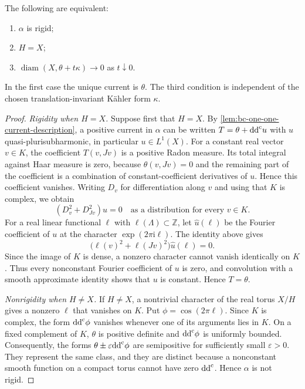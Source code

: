 \begin{theorem}\label{thm:flat-torus-radial-rigidity}
The following are equivalent:
\begin{enumerate}
\item $\alpha$ is rigid;
\item $H=X$;
\item $\operatorname{diam}(X,\theta+t\kappa)\to0$ as $t\downarrow0$.
\end{enumerate}
In the first case the unique current is $\theta$. The third condition is independent of the chosen translation-invariant K\"ahler form $\kappa$.
\end{theorem}
\begin{proof}
\emph{Rigidity when $H=X$.} Suppose first that $H=X$. By \cref{lem:bc-one-one-current-description}, a positive current in $\alpha$ can be written $T=\theta+\mathrm{dd}^{\mathrm{c}} u$ with $u$ quasi-plurisubharmonic, in particular $u\in L^1(X)$. For a constant real vector $v\in K$, the coefficient $T(v,Jv)$ is a positive Radon measure. Its total integral against Haar measure is zero, because $\theta(v,Jv)=0$ and the remaining part of the coefficient is a combination of constant-coefficient derivatives of $u$. Hence this coefficient vanishes. Writing $D_v$ for differentiation along $v$ and using that $K$ is complex, we obtain
\[
 (D_v^2+D_{Jv}^2)u=0
 \quad\text{as a distribution for every }v\in K.
\]
For a real linear functional $\ell$ with $\ell(\Lambda)\subset\mathbb Z$, let $\widehat u(\ell)$ be the Fourier coefficient of $u$ at the character $\exp(2\pi\mathrm i\ell)$. The identity above gives
\[
 \bigl(\ell(v)^2+\ell(Jv)^2\bigr)\widehat u(\ell)=0.
\]
Since the image of $K$ is dense, a nonzero character cannot vanish identically on $K$. Thus every nonconstant Fourier coefficient of $u$ is zero, and convolution with a smooth approximate identity shows that $u$ is constant. Hence $T=\theta$.

\emph{Nonrigidity when $H\ne X$.} If $H\ne X$, a nontrivial character of the real torus $X/H$ gives a nonzero $\ell$ that vanishes on $K$. Put $\phi=\cos(2\pi\ell)$. Since $K$ is complex, the form $\mathrm{dd}^{\mathrm{c}}\phi$ vanishes whenever one of its arguments lies in $K$. On a fixed complement of $K$, $\theta$ is positive definite and $\mathrm{dd}^{\mathrm{c}}\phi$ is uniformly bounded. Consequently, the forms $\theta\pm\varepsilon\mathrm{dd}^{\mathrm{c}}\phi$ are semipositive for sufficiently small $\varepsilon>0$. They represent the same class, and they are distinct because a nonconstant smooth function on a compact torus cannot have zero $\mathrm{dd}^{\mathrm{c}}$. Hence $\alpha$ is not rigid.


\end{proof}
